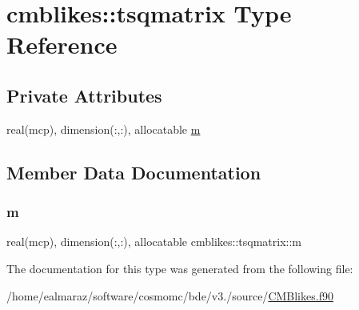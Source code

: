 \hypertarget{structcmblikes_1_1tsqmatrix}{}\section{cmblikes\+:\+:tsqmatrix Type Reference}
\label{structcmblikes_1_1tsqmatrix}
\subsection*{Private Attributes}
\begin{DoxyCompactItemize}
\item 
real(mcp), dimension(\+:,\+:), allocatable \mbox{\hyperlink{structcmblikes_1_1tsqmatrix_ab31df0d1b04de4fa8d36f0ac5938f38c}{m}}
\end{DoxyCompactItemize}


\subsection{Member Data Documentation}
\mbox{\label{structcmblikes_1_1tsqmatrix_ab31df0d1b04de4fa8d36f0ac5938f38c}} 
\subsubsection{\texorpdfstring{m}{m}}
{\footnotesize\ttfamily real(mcp), dimension(\+:,\+:), allocatable cmblikes\+::tsqmatrix\+::m\hspace{0.3cm}{\ttfamily [private]}}



The documentation for this type was generated from the following file\+:\begin{DoxyCompactItemize}
\item 
/home/ealmaraz/software/cosmomc/bde/v3./source/\mbox{\hyperlink{CMBlikes_8f90}{C\+M\+Blikes.\+f90}}\end{DoxyCompactItemize}

